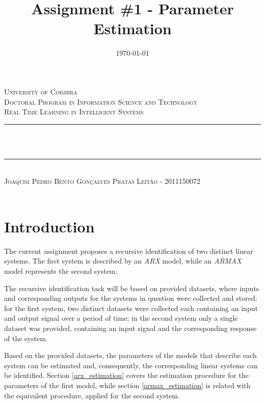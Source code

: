 \documentclass[11pt]{article}
\title{Assignment \#1 - Parameter Estimation}
\date{\today}
\makeatletter
\let\thetitle\@title
\let\thedate\@date
\makeatother
\begin{document}

\begin{titlepage}
	\centering
    \textsc{\LARGE University of Coimbra}\\[1.0 cm]
	\textsc{\large Doctoral Program in Information Science and Technology}\\[0.5 cm]
    \textsc{\large Real Time Learning in Intelligent Systems}\\[5 cm]
	\rule{\linewidth}{0.2 mm} \\[0.4 cm]
	{ \LARGE \bfseries \thetitle}\\ [0.2 cm]
    \rule{\linewidth}{0.2 mm} \\[3 cm]
    
    \textsc{Joaquim Pedro Bento Gonçalves Pratas Leitão - 2011150072}\\[5 cm]
	
	{\large \thedate}\\[2 cm]
 
	\vfill
	
\end{titlepage}


\section{Introduction}
\label{introduction}

The current assignment proposes a recursive identification of two distinct linear systems. The first system is described by an \emph{ARX} model, while an \emph{ARMAX} model represents the second system.

The recursive identification task will be based on provided datasets, where inputs and corresponding outputs for the systems in question were collected and stored: for the first system, two distinct datasets were collected each containing an input and output signal over a period of time; in the second system only a single dataset was provided, containing an input signal and the corresponding response of the system.

Based on the provided datasets, the parameters of the models that describe each system can be estimated and, consequently, the corresponding linear systems can be identified. Section \ref{arx_estimation} covers the estimation procedure for the parameters of the first model, while section \ref{armax_estimation} is related with the equivalent procedure, applied for the second system.
\end{document}
